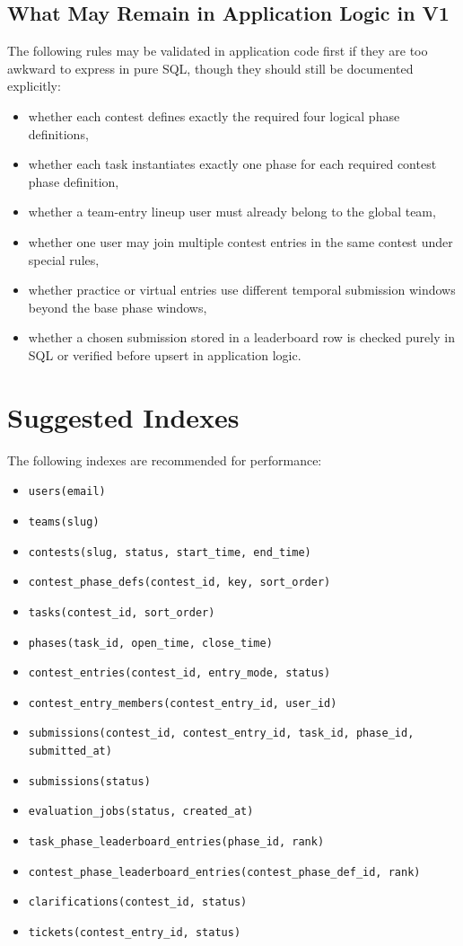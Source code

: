 \documentclass[11pt,a4paper]{article}
\begin{document}
\subsection{What May Remain in Application Logic in V1}
The following rules may be validated in application code first if they are too awkward to express in pure SQL, though they should still be documented explicitly:
\begin{itemize}
    \item whether each contest defines exactly the required four logical phase definitions,
    \item whether each task instantiates exactly one phase for each required contest phase definition,
    \item whether a team-entry lineup user must already belong to the global team,
    \item whether one user may join multiple contest entries in the same contest under special rules,
    \item whether practice or virtual entries use different temporal submission windows beyond the base phase windows,
    \item whether a chosen submission stored in a leaderboard row is checked purely in SQL or verified before upsert in application logic.
\end{itemize}

\section{Suggested Indexes}
The following indexes are recommended for performance:

\begin{itemize}
    \item \texttt{users(email)}
    \item \texttt{teams(slug)}
    \item \texttt{contests(slug, status, start\_time, end\_time)}
    \item \texttt{contest\_phase\_defs(contest\_id, key, sort\_order)}
    \item \texttt{tasks(contest\_id, sort\_order)}
    \item \texttt{phases(task\_id, open\_time, close\_time)}
    \item \texttt{contest\_entries(contest\_id, entry\_mode, status)}
    \item \texttt{contest\_entry\_members(contest\_entry\_id, user\_id)}
    \item \texttt{submissions(contest\_id, contest\_entry\_id, task\_id, phase\_id, submitted\_at)}
    \item \texttt{submissions(status)}
    \item \texttt{evaluation\_jobs(status, created\_at)}
    \item \texttt{task\_phase\_leaderboard\_entries(phase\_id, rank)}
    \item \texttt{contest\_phase\_leaderboard\_entries(contest\_phase\_def\_id, rank)}
    \item \texttt{clarifications(contest\_id, status)}
    \item \texttt{tickets(contest\_entry\_id, status)}
\end{itemize}
\end{document}
